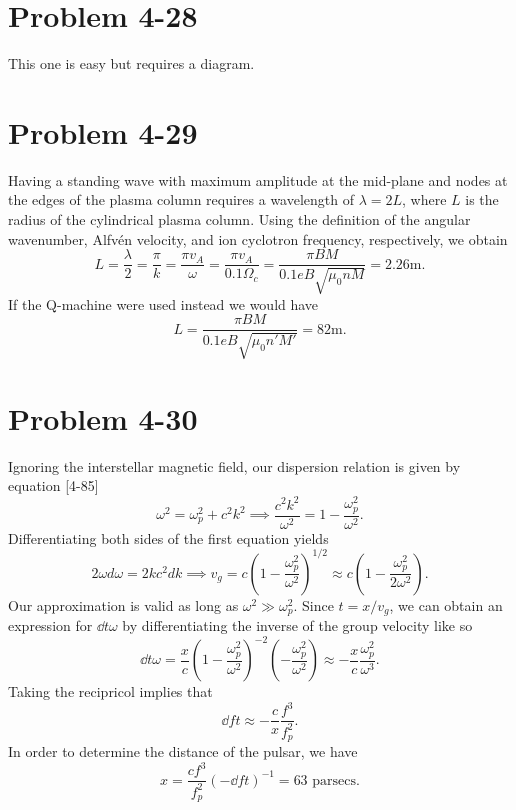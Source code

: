 \section*{Problem 4-28}
\label{sec:4-28}
This one is easy but requires a diagram. 

\section*{Problem 4-29}
\label{sec:4-29}
Having a standing wave with maximum amplitude at the mid-plane and nodes at the edges of the plasma column requires a wavelength of \(\lambda = 2L \), where \(L\) is the radius of the cylindrical plasma column. Using the definition of the angular wavenumber, Alfv\'en velocity, and ion cyclotron frequency, respectively, we obtain
\begin{equation*}
	L = \dfrac{\lambda}{2} = \dfrac{\pi}{k} = \dfrac{\pi v_A}{\omega} = \dfrac{\pi v_A}{0.1\Omega_c} = \dfrac{\pi B M}{0.1eB\sqrt{\mu_0nM}} = 2.26\text{m}.
\end{equation*}
If the Q-machine were used instead we would have
\begin{equation*}
	L =  \dfrac{\pi B M}{0.1eB\sqrt{\mu_0n'M'}} = 82\text{m}.
\end{equation*}

\section*{Problem 4-30}
\label{sec:4-30}
Ignoring the interstellar magnetic field, our dispersion relation is given by equation [4-85]
\begin{equation*}
	\omega^2 = \omega_p^2 + c^2k^2 \implies \dfrac{c^2k^2}{\omega^2} = 1 - \dfrac{\omega_p^2}{\omega^2}.
\end{equation*}
Differentiating both sides of the first equation yields
\begin{equation*}
	2\omega d\omega = 2kc^2dk \implies v_g = c\left(1 - \dfrac{\omega_p^2}{\omega^2}\right)^{1/2} \approx c\left(1 - \dfrac{\omega_p^2}{2\omega^2}\right).
\end{equation*}
Our approximation is valid as long as \(\omega^2 \gg \omega_p^2 \). Since \(t = x/v_g \), we can obtain an expression for \(\dd{t}{\omega} \) by differentiating the inverse of the group velocity like so
\begin{equation*}
	\dd{t}{\omega} = \dfrac{x}{c}\left(1 - \dfrac{\omega_p^2}{\omega^2}\right)^{-2}\left(-\dfrac{\omega_p^2}{\omega^2} \right) \approx -\dfrac{x}{c}\dfrac{\omega_p^2}{\omega^3}.
\end{equation*}
Taking the recipricol implies that 
\begin{equation*}
	\dd{f}{t} \approx -\dfrac{c}{x}\dfrac{f^3}{f^2_p}.
\end{equation*}
In order to determine the distance of the pulsar, we have
\begin{equation*}
	x = \dfrac{cf^3}{f^2_p}\left(-\dd{f}{t} \right)^{-1} = 63\text{ parsecs}.
\end{equation*}